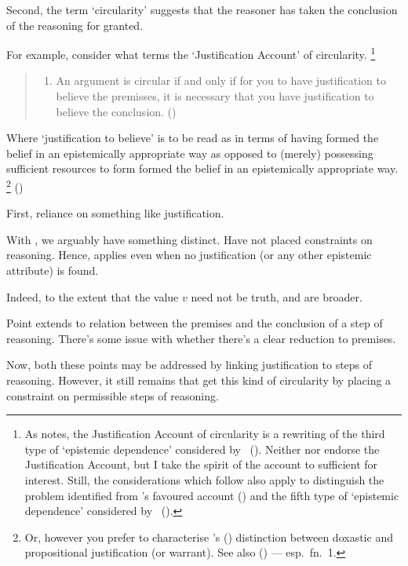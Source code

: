 \begin{note}
  Second, the term `circularity' suggests that the reasoner has taken the conclusion of the reasoning for granted.

  For example, consider what \citeauthor{Sgaravatti:2013wu} terms the `Justification Account' of circularity.\nolinebreak
  \footnote{
    As \citeauthor{Sgaravatti:2013wu} notes, the Justification Account of circularity is a rewriting of the third type of `epistemic dependence' considered by \citeauthor{Pryor:2004ws}~(\citeyear[359]{Pryor:2004ws}).
    Neither \citeauthor{Pryor:2004ws} nor \citeauthor{Sgaravatti:2013wu} endorse the Justification Account, but I take the spirit of the account to sufficient for interest.
    Still, the considerations which follow also apply to distinguish the {\color{red} problem identified} from \citeauthor{Sgaravatti:2013wu}'s favoured account (\Citeyear[\S3]{Sgaravatti:2013wu}) and the fifth type of `epistemic dependence' considered by \citeauthor{Pryor:2004ws}~(\citeyear[359]{Pryor:2004ws}).
  }

  \begin{quote}
    \begin{enumerate}[label=(JA), ref=(JA)]
    \item\label{sg:JA} An argument is circular if and only if for you to have justification to believe the premisses, it is necessary that you have justification to believe the conclusion.\nolinebreak
      \mbox{}\hfill\mbox{(\Citeyear[754]{Sgaravatti:2013wu})}
    \end{enumerate}
  \end{quote}
  Where `justification to believe' is to be read as in terms of having formed the belief in an epistemically appropriate way as opposed to (merely) possessing sufficient resources to form formed the belief in an epistemically appropriate way.\nolinebreak
  \footnote{
    Or, however you prefer to characterise \citeauthor{Firth:1978vi}'s (\Citeyear{Firth:1978vi}) distinction between doxastic and propositional justification (or warrant).
    See also \citeauthor{Silva:2020aa} (\Citeyear{Silva:2020aa}) --- esp.\ fn.\ 1.
  }
  (\citeauthor[Cf.][754--755]{Sgaravatti:2013wu})
\end{note}

\begin{note}
  First, reliance on something like justification.

  With \support{}, we arguably have something distinct.
  Have not placed constraints on reasoning.
  Hence, \ideaCS{} applies even when no justification (or any other epistemic attribute) is found.

  Indeed, to the extent that the value \(v\) need not be truth, \ideaS{} and \ideaCS{} are broader.

  Point extends to relation between the premises and the conclusion of a step of reasoning.
  There's some issue with whether there's a clear reduction to premises.

  Now, both these points may be addressed by linking justification to steps of reasoning.
  However, it still remains that get this kind of circularity by placing a constraint on permissible steps of reasoning.
\end{note}

